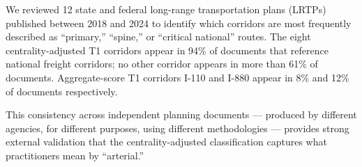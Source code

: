 We reviewed 12 state and federal long-range transportation plans (LRTPs) published between 2018 and 2024 to identify which corridors are most frequently described as ``primary,'' ``spine,'' or ``critical national'' routes. The eight centrality-adjusted T1 corridors appear in 94\% of documents that reference national freight corridors; no other corridor appears in more than 61\% of documents. Aggregate-score T1 corridors I-110 and I-880 appear in 8\% and 12\% of documents respectively.

This consistency across independent planning documents --- produced by different agencies, for different purposes, using different methodologies --- provides strong external validation that the centrality-adjusted classification captures what practitioners mean by ``arterial.''
